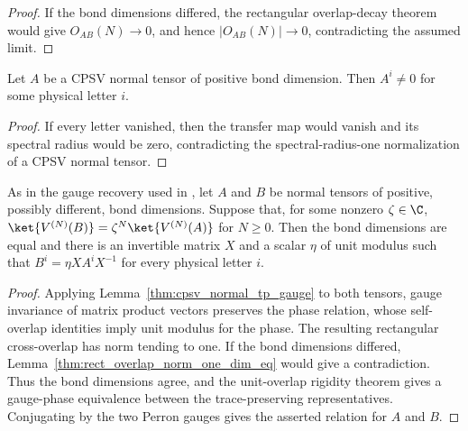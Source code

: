 \begin{proof}\leanok
    If the bond dimensions differed, the rectangular overlap-decay theorem
    would give $O_{AB}(N)\to0$, and hence $|O_{AB}(N)|\to0$, contradicting the
    assumed limit.
\end{proof}

\begin{lemma}
    \label{thm:cpsv_normal_nonzero_letter}
    \leanok
    Let $A$ be a CPSV normal tensor of positive bond dimension. Then
    $A^i\ne 0$ for some physical letter $i$.
\end{lemma}

\begin{proof}\leanok
    If every letter vanished, then the transfer map would vanish and its
    spectral radius would be zero, contradicting the spectral-radius-one
    normalization of a CPSV normal tensor.
\end{proof}

\begin{lemma}
    \label{thm:cpsv_normal_mpv_phase_gauge}
    \leanok
    As in the gauge recovery used in \cite[Appendix~A]{Cirac2016MPDO_arXiv},
    let $A$ and $B$ be normal tensors of positive, possibly different, bond
    dimensions. Suppose that, for some nonzero $\zeta\in\C$,
    $\ket{V^{(N)}(B)}=\zeta^N\ket{V^{(N)}(A)}$ for $N\geq 0$.
    Then the bond dimensions are equal and there is an invertible matrix $X$
    and a scalar $\eta$ of unit modulus such that
    $B^i=\eta X A^iX^{-1}$ for every physical letter $i$.
\end{lemma}

\begin{proof}\leanok
    Applying Lemma~\ref{thm:cpsv_normal_tp_gauge} to both tensors, gauge
    invariance of matrix product vectors preserves the phase relation, whose
    self-overlap identities imply unit modulus for the phase. The resulting
    rectangular cross-overlap has norm tending to one. If the bond dimensions
    differed, Lemma~\ref{thm:rect_overlap_norm_one_dim_eq} would give a
    contradiction. Thus the bond dimensions agree, and the
    unit-overlap rigidity theorem gives a gauge-phase equivalence between the
    trace-preserving representatives. Conjugating by the two Perron gauges
    gives the asserted relation for $A$ and $B$.
\end{proof}

